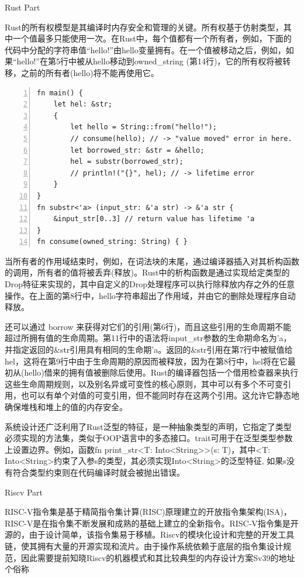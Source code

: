 
Rust Part

Rust的所有权模型是其编译时内存安全和管理的关键。所有权基于仿射类型，其中一个值最多只能使用一次。在Rust中，每个值都有一个所有者，例如，下面的代码中分配的字符串值“hello!”由hello变量拥有。在一个值被移动之后，例如，如果“hello!”在第5行中被从hello移动到owned\_string (第14行)，它的所有权将被转移，之前的所有者(hello)将不能再使用它。

\begin{lstlisting}[caption=Rust Demo, numbers=left]
fn main() {
	let hel: &str;
	{
		let hello = String::from("hello!");
		// consume(hello); // -> "value moved" error in here.
		let borrowed_str: &str = &hello;
		hel = substr(borrowed_str);
		// println!("{}", hel); // -> lifetime error
	}
}
fn substr<'a> (input_str: &'a str) -> &'a str {
	&input_str[0..3] // return value has lifetime 'a
}
fn consume(owned_string: String) { }
\end{lstlisting}


当所有者的作用域结束时，例如，在词法块的末尾，通过编译器插入对其析构函数的调用，所有者的值将被丢弃(释放)。Rust中的析构函数是通过实现给定类型的Drop特征来实现的，其中自定义的Drop处理程序可以执行除释放内存之外的任意操作。在上面的第8行中，hello字符串超出了作用域，并由它的删除处理程序自动释放。

还可以通过 borrow 来获得对它们的引用(第6行)，而且这些引用的生命周期不能超过所拥有值的生命周期。第11行中的语法将input\_str参数的生命期命名为'a，并指定返回的\&str引用具有相同的生命期'a。返回的\&str引用在第7行中被赋值给hel，这将在第9行中由于生命周期的原因而被释放，因为在第8行中，hel将在它最初从(hello)借来的拥有值被删除后使用。Rust的编译器包括一个借用检查器来执行这些生命周期规则，以及别名异或可变性的核心原则，其中可以有多个不可变引用，也可以有单个对值的可变引用，但不能同时存在这两个引用。这允许它静态地确保堆栈和堆上的值的内存安全。

系统设计还广泛利用了Rust泛型的特征，是一种抽象类型的声明，它指定了类型必须实现的方法集，类似于OOP语言中的多态接口。trait可用于在泛型类型参数上设置边界。例如，函数fn print\_str<T: Into<String>>(s: T){}，其中<T: Into<String>约束了入参s的类型，其必须实现Into<String>的泛型特征, 如果s没有符合类型约束则在代码编译时就会被抛出错误。


Riscv Part

RISC-V指令集是基于精简指令集计算(RISC)原理建立的开放指令集架构(ISA)，RISC-V是在指令集不断发展和成熟的基础上建立的全新指令。RISC-V指令集是开源的，由于设计简单，该指令集易于移植。Riscv的模块化设计和完整的开发工具链，使其拥有大量的开源实现和流片。由于操作系统依赖于底层的指令集设计规范，因此需要提前知晓Riscv的机器模式和其比较典型的内存设计方案Sv39的地址个俗称
